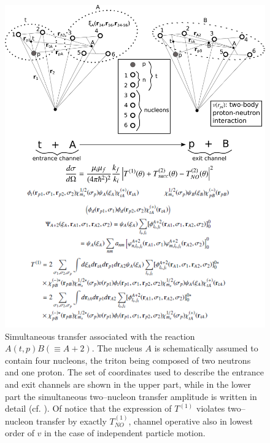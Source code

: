 \documentclass[a4paper,11pt]{book}
\numberwithin{equation}{section}
\numberwithin{figure}{section}
\numberwithin{table}{section}
\begin{document}
\begin{figure}
\centerline{\includegraphics*[width=\textwidth,angle=0]{figs/fig_alpha.pdf}}
\caption{Simultaneous transfer associated with the reaction $A(t,p)B(\equiv A+2)$. The nucleus $A$ is schematically assumed to contain four nucleons, the triton being composed of two neutrons and one proton. The set of coordinates used to describe the entrance and exit channels are shown in the upper part, while in the lower part the simultaneous two--nucleon transfer amplitude is written in detail (cf. \cite{Potel:13b}). Of notice that the expression of $T^{(1)}$ violates two--nucleon transfer by exactly $T^{(1)}_{NO}$, channel operative also in lowest order of $v$ in the case of independent particle motion.}\label{fig_alpha}
\end{figure}
\end{document}
